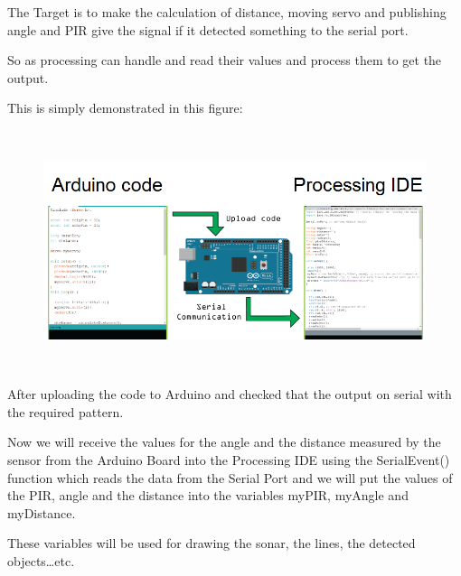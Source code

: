 The Target is to make the calculation of distance, moving servo and publishing angle and PIR give the signal if it detected something to the serial port.

So as processing can handle and read their values and process them to get the output.

This is simply demonstrated in this figure:

\begin{figure}[H]
	\centering
	\includegraphics[width=14cm,height=7cm]{figures/sonar2}
\end{figure}
After uploading the code to Arduino and checked that the output on serial with the required pattern.

Now we will receive the values for the angle and the distance measured by the sensor from the Arduino Board into the Processing IDE using the SerialEvent() function which reads the data from the Serial Port and we will put the values of the PIR, angle and the distance into the variables myPIR, myAngle and myDistance.

These variables will be used for drawing the sonar, the lines, the detected objects{\dots}etc.

